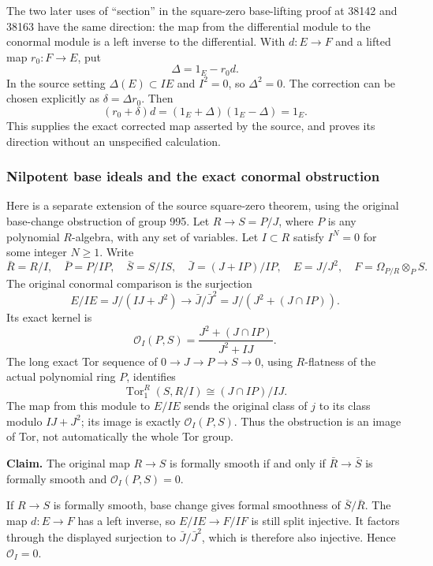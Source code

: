The two later uses of ``section'' in the square-zero base-lifting proof at 38142 and 38163 have the same direction: the map from the differential module to the conormal module is a left inverse to the differential. With \(d:E\to F\) and a lifted map \(r_0:F\to E\), put \[
\Delta=1_E-r_0d.
\] In the source setting \(\Delta(E)\subset IE\) and \(I^2=0\), so \(\Delta^2=0\). The correction can be chosen explicitly as \(\delta=\Delta r_0\). Then \[
(r_0+\delta)d=(1_E+\Delta)(1_E-\Delta)=1_E.
\] This supplies the exact corrected map asserted by the source, and proves its direction without an unspecified calculation.

\subsubsection{Nilpotent base ideals and the exact conormal obstruction}\label{algebra-proof-048-nilpotent-base-ideals-and-the-exact-conormal-obstruction}

Here is a separate extension of the source square-zero theorem, using the original base-change obstruction of group 995. Let \(R\to S=P/J\), where \(P\) is any polynomial \(R\)-algebra, with any set of variables. Let \(I\subset R\) satisfy \(I^N=0\) for some integer \(N\ge1\). Write \[
\bar R=R/I,\quad \bar P=P/IP,\quad \bar S=S/IS,\quad
\bar J=(J+IP)/IP,\quad E=J/J^2,\quad F=\Omega_{P/R}\otimes_PS.
\] The original conormal comparison is the surjection \[
E/IE=J/(IJ+J^2)\longrightarrow
\bar J/\bar J^2=J/(J^2+(J\cap IP)).
\] Its exact kernel is \[
\mathcal O_I(P,S)=\frac{J^2+(J\cap IP)}{J^2+IJ}.
\] The long exact Tor sequence of \(0\to J\to P\to S\to0\), using \(R\)-flatness of the actual polynomial ring \(P\), identifies \[
\operatorname{Tor}_1^R(S,R/I)\cong (J\cap IP)/IJ.
\] The map from this module to \(E/IE\) sends the original class of \(j\) to its class modulo \(IJ+J^2\); its image is exactly \(\mathcal O_I(P,S)\). Thus the obstruction is an image of Tor, not automatically the whole Tor group.

\textbf{Claim.} The original map \(R\to S\) is formally smooth if and only if \(\bar R\to\bar S\) is formally smooth and \(\mathcal O_I(P,S)=0\).

If \(R\to S\) is formally smooth, base change gives formal smoothness of \(\bar S/\bar R\). The map \(d:E\to F\) has a left inverse, so \(E/IE\to F/IF\) is still split injective. It factors through the displayed surjection to \(\bar J/\bar J^2\), which is therefore also injective. Hence \(\mathcal O_I=0\).

